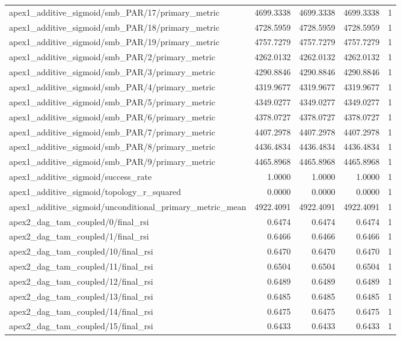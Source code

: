 \begin{table}[h]
\begin{tabular}{lrrrr}
apex1_additive_sigmoid/smb_PAR/17/primary_metric & 4699.3338 & 4699.3338 & 4699.3338 & 1 \\
apex1_additive_sigmoid/smb_PAR/18/primary_metric & 4728.5959 & 4728.5959 & 4728.5959 & 1 \\
apex1_additive_sigmoid/smb_PAR/19/primary_metric & 4757.7279 & 4757.7279 & 4757.7279 & 1 \\
apex1_additive_sigmoid/smb_PAR/2/primary_metric & 4262.0132 & 4262.0132 & 4262.0132 & 1 \\
apex1_additive_sigmoid/smb_PAR/3/primary_metric & 4290.8846 & 4290.8846 & 4290.8846 & 1 \\
apex1_additive_sigmoid/smb_PAR/4/primary_metric & 4319.9677 & 4319.9677 & 4319.9677 & 1 \\
apex1_additive_sigmoid/smb_PAR/5/primary_metric & 4349.0277 & 4349.0277 & 4349.0277 & 1 \\
apex1_additive_sigmoid/smb_PAR/6/primary_metric & 4378.0727 & 4378.0727 & 4378.0727 & 1 \\
apex1_additive_sigmoid/smb_PAR/7/primary_metric & 4407.2978 & 4407.2978 & 4407.2978 & 1 \\
apex1_additive_sigmoid/smb_PAR/8/primary_metric & 4436.4834 & 4436.4834 & 4436.4834 & 1 \\
apex1_additive_sigmoid/smb_PAR/9/primary_metric & 4465.8968 & 4465.8968 & 4465.8968 & 1 \\
apex1_additive_sigmoid/success_rate & 1.0000 & 1.0000 & 1.0000 & 1 \\
apex1_additive_sigmoid/topology_r_squared & 0.0000 & 0.0000 & 0.0000 & 1 \\
apex1_additive_sigmoid/unconditional_primary_metric_mean & 4922.4091 & 4922.4091 & 4922.4091 & 1 \\
apex2_dag_tam_coupled/0/final_rsi & 0.6474 & 0.6474 & 0.6474 & 1 \\
apex2_dag_tam_coupled/1/final_rsi & 0.6466 & 0.6466 & 0.6466 & 1 \\
apex2_dag_tam_coupled/10/final_rsi & 0.6470 & 0.6470 & 0.6470 & 1 \\
apex2_dag_tam_coupled/11/final_rsi & 0.6504 & 0.6504 & 0.6504 & 1 \\
apex2_dag_tam_coupled/12/final_rsi & 0.6489 & 0.6489 & 0.6489 & 1 \\
apex2_dag_tam_coupled/13/final_rsi & 0.6485 & 0.6485 & 0.6485 & 1 \\
apex2_dag_tam_coupled/14/final_rsi & 0.6475 & 0.6475 & 0.6475 & 1 \\
apex2_dag_tam_coupled/15/final_rsi & 0.6433 & 0.6433 & 0.6433 & 1 \\

\end{tabular}
\end{table}
